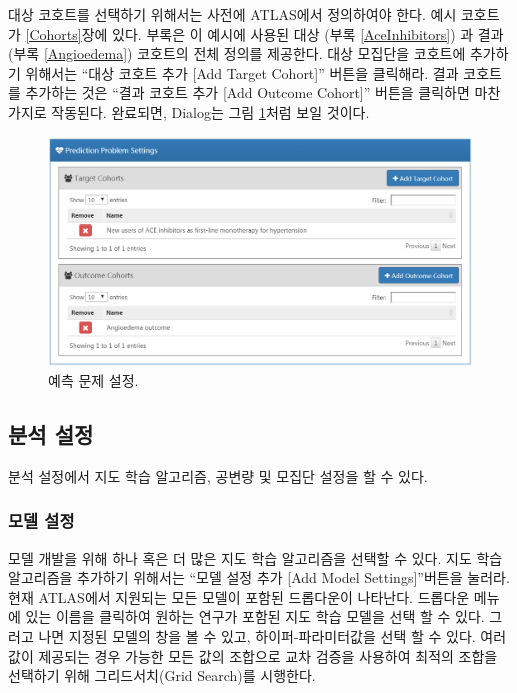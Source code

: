\documentclass[10.5pt]{book}
\theoremstyle{definition}
\theoremstyle{definition}
\theoremstyle{definition}
\theoremstyle{remark}
\begin{document}
대상 코호트를 선택하기 위해서는 사전에 ATLAS에서 정의하여야 한다. 예시
코호트가 \ref{Cohorts}장에 있다. 부록은 이 예시에 사용된 대상 (부록
\ref{AceInhibitors}) 과 결과 (부록 \ref{Angioedema}) 코호트의 전체
정의를 제공한다. 대상 모집단을 코호트에 추가하기 위해서는 ``대상 코호트
추가 {[}Add Target Cohort{]}'' 버튼을 클릭해라. 결과 코호트를 추가하는
것은 ``결과 코호트 추가 {[}Add Outcome Cohort{]}'' 버튼을 클릭하면
마찬가지로 작동된다. 완료되면, Dialog는 그림
\ref{fig:problemSettings}처럼 보일 것이다.

\begin{figure}

{\centering \includegraphics[width=1\linewidth]{images/PatientLevelPrediction/problemSettings} 

}

\caption{예측 문제 설정.}\label{fig:problemSettings}
\end{figure}

\subsection{분석 설정}\label{-}

분석 설정에서 지도 학습 알고리즘, 공변량 및 모집단 설정을 할 수 있다.

\subsubsection*{모델 설정}\label{-}

모델 개발을 위해 하나 혹은 더 많은 지도 학습 알고리즘을 선택할 수 있다.
지도 학습 알고리즘을 추가하기 위해서는 ``모델 설정 추가 {[}Add Model
Settings{]}''버튼을 눌러라. 현재 ATLAS에서 지원되는 모든 모델이 포함된
드롭다운이 나타난다. 드롭다운 메뉴에 있는 이름을 클릭하여 원하는 연구가
포함된 지도 학습 모델을 선택 할 수 있다. 그러고 나면 지정된 모델의 창을
볼 수 있고, 하이퍼-파라미터값을 선택 할 수 있다. 여러 값이 제공되는 경우
가능한 모든 값의 조합으로 교차 검증을 사용하여 최적의 조합을 선택하기
위해 그리드서치(Grid Search)를 시행한다.
\end{document}
